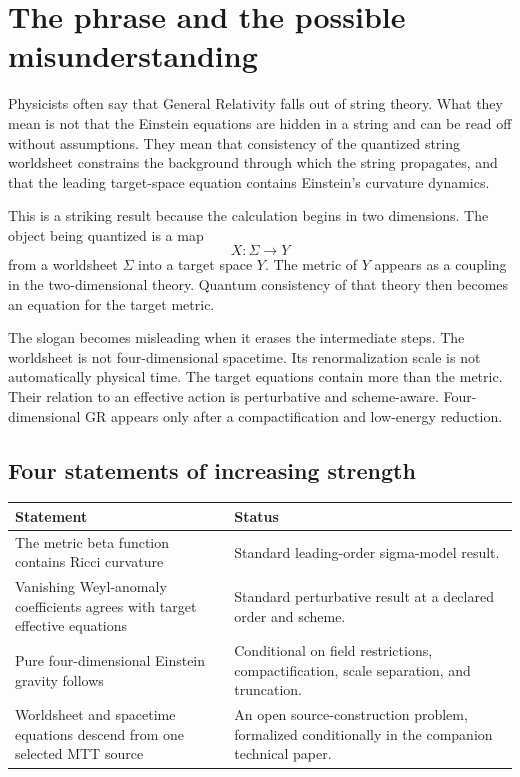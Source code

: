 \documentclass[11pt]{article}
\begin{document}
\tableofcontents

\section{The phrase and the possible misunderstanding}

Physicists often say that General Relativity falls out of string theory.
What they mean is not that the Einstein equations are hidden in a string and
can be read off without assumptions.  They mean that consistency of the
quantized string worldsheet constrains the background through which the
string propagates, and that the leading target-space equation contains
Einstein's curvature dynamics.

This is a striking result because the calculation begins in two dimensions.
The object being quantized is a map
\[
X:\Sigma\longrightarrow Y
\]
from a worldsheet \(\Sigma\) into a target space \(Y\).  The metric of \(Y\)
appears as a coupling in the two-dimensional theory.  Quantum consistency of
that theory then becomes an equation for the target metric.

The slogan becomes misleading when it erases the intermediate steps.  The
worldsheet is not four-dimensional spacetime.  Its renormalization scale is
not automatically physical time.  The target equations contain more than
the metric.  Their relation to an effective action is perturbative and
scheme-aware.  Four-dimensional GR appears only after a compactification and
low-energy reduction.

\subsection{Four statements of increasing strength}

\begin{center}
\small
\begin{tabularx}{\textwidth}{@{}L{0.27\textwidth}X@{}}
\toprule
Statement & Status\\
\midrule
The metric beta function contains Ricci curvature & Standard leading-order
sigma-model result.\\
Vanishing Weyl-anomaly coefficients agrees with target effective equations &
Standard perturbative result at a declared order and scheme.\\
Pure four-dimensional Einstein gravity follows & Conditional on field
restrictions, compactification, scale separation, and truncation.\\
Worldsheet and spacetime equations descend from one selected MTT source &
An open source-construction problem, formalized conditionally in the
companion technical paper.\\
\bottomrule
\end{tabularx}
\end{center}
\end{document}

